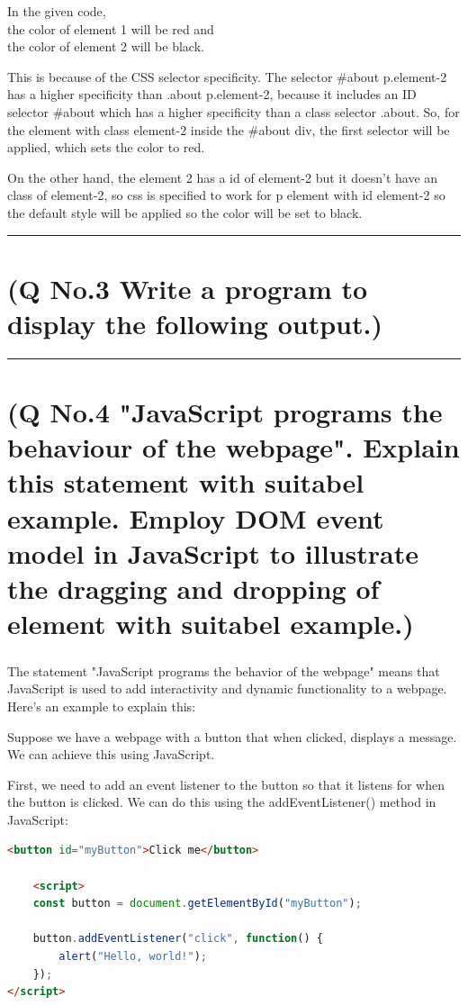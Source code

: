 \documentclass[11pt]{article}
\begin{document}
In the given code, \\the color of element 1 will be red and\\ the color of element 2 will be black.

This is because of the CSS selector specificity. The selector \#about p.element-2 has a higher specificity than .about p.element-2, because it includes an ID selector \#about which has a higher specificity than a class selector .about. So, for the element with class element-2 inside the \#about div, the first selector will be applied, which sets the color to red.

On the other hand, the element 2 has a id of element-2 but it doesn't have an class of element-2, so css is specified to work for p element with id element-2 so the default style will be applied so the color will be set to black.


\noindent\rule{\linewidth}{0.4pt}
\section{(Q No.3 Write a program to display the following output.) }







\noindent\rule{\linewidth}{0.4pt}
\section{(Q No.4 "JavaScript programs the behaviour of the webpage". Explain this statement with suitabel example. Employ DOM event model in JavaScript to illustrate the dragging and dropping of element with suitabel example.) }
\subparagraph{}
The statement "JavaScript programs the behavior of the webpage" means that JavaScript is used to add interactivity and dynamic functionality to a webpage. Here's an example to explain this:

Suppose we have a webpage with a button that when clicked, displays a message. We can achieve this using JavaScript.

First, we need to add an event listener to the button so that it listens for when the button is clicked. We can do this using the addEventListener() method in JavaScript:

\begin{lstlisting}[language=html]
    <button id="myButton">Click me</button>

    <script>
    const button = document.getElementById("myButton");

    button.addEventListener("click", function() {
        alert("Hello, world!");
    });
</script>

\end{lstlisting}
\end{document}
